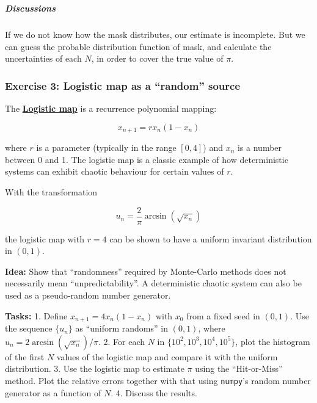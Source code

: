 \documentclass[11pt]{article}
\begin{document}
    \begin{center}
    \end{center}
    { \hspace*{\fill} \\}
    
    \subparagraph{Discussions}\label{discussions}

If we do not know how the mask distributes, our estimate is incomplete.
But we can guess the probable distribution function of mask, and
calculate the uncertainties of each \(N\), in order to cover the true
value of \(\pi\).

    \subsubsection{Exercise 3: Logistic map as a ``random''
source}\label{exercise-3-logistic-map-as-a-random-source}

The \href{https://en.wikipedia.org/wiki/Logistic_map}{\textbf{Logistic
map}} is a recurrence polynomial mapping:

\[
x_{n+1} = r x_n (1 - x_n)
\]

where \(r\) is a parameter (typically in the range \([0, 4]\)) and
\(x_n\) is a number between 0 and 1. The logistic map is a classic
example of how deterministic systems can exhibit chaotic behaviour for
certain values of \(r\).

With the transformation

\[
u_n = \frac{2}{\pi} \arcsin(\sqrt{x_n})
\]

the logistic map with \(r=4\) can be shown to have a uniform invariant
distribution in \((0, 1)\).

\textbf{Idea:} Show that ``randomness'' required by Monte-Carlo methods
does not necessarily mean ``unpredictability''. A deterministic chaotic
system can also be used as a pseudo-random number generator.

\textbf{Tasks:} 1. Define \(x_{n+1} = 4 x_n (1 - x_n)\) with \(x_0\)
from a fixed seed in \((0, 1)\). Use the sequence \(\{u_n\}\) as
``uniform randoms'' in \((0,1)\), where
\(u_n = 2 \arcsin(\sqrt{x_n}) / \pi\). 2. For each \(N\) in
\(\{10^2, 10^3, 10^4, 10^5\}\), plot the histogram of the first \(N\)
values of the logistic map and compare it with the uniform distribution.
3. Use the logistic map to estimate \(\pi\) using the ``Hit-or-Miss''
method. Plot the relative errors together with that using
\texttt{numpy}'s random number generator as a function of \(N\). 4.
Discuss the results.
\end{document}

